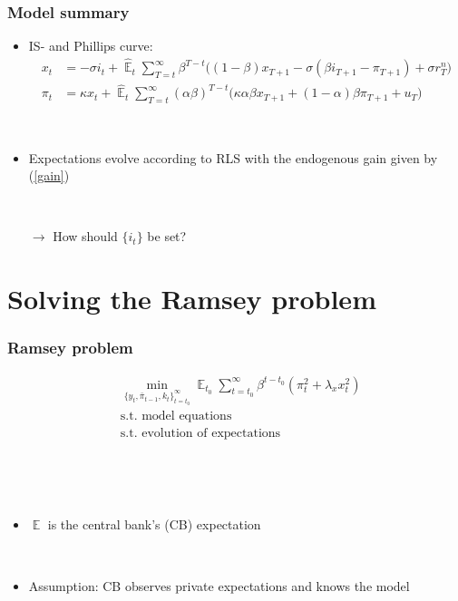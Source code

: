 \documentclass[10pt]{beamer}
\DeclareMathOperator{\E}{\mathbb{E}}
\begin{document}
\begin{frame}
	\frametitle{Model summary}
	\label{aggregate_LOMS}
\begin{itemize}
\item IS- and Phillips curve:	
 \begin{align}
x_t &=  -\sigma i_t +\hat{\E}_t \sum_{T=t}^{\infty} \beta^{T-t }\big( (1-\beta)x_{T+1} - \sigma(\beta i_{T+1} - \pi_{T+1}) +\sigma r_T^n \big)  \label{NKIS}  \\
\pi_t &= \kappa x_t +\hat{\E}_t \sum_{T=t}^{\infty} (\alpha\beta)^{T-t }\big( \kappa \alpha \beta x_{T+1} + (1-\alpha)\beta \pi_{T+1} + u_T\big) \label{NKPC} 
\end{align}
\hfill \hyperlink{derivations}{} \hyperlink{ALMs}{}

\

\item  Expectations evolve according to RLS with the endogenous gain given by (\ref{gain})

\

\item[$\rightarrow$] How should $\{ i_t \}$ be set?
\end{itemize}



\end{frame}


\section{Solving the Ramsey problem}

\begin{frame}
	\frametitle{Ramsey problem}
	 \begin{align*}
& \min_{ \{y_t, \bar{\pi}_{t-1}, k_t \}_{t=t_0}^{\infty}} \E_{t_0}\sum_{t=t_0}^{\infty} \beta^{t-t_0} (\pi_t^2  + \lambda_x x_t^2 )  \\
& \text{s.t. model equations} \\
& \text{s.t. evolution of expectations} 
\end{align*}

\

\

\begin{itemize}
\item $\E$ is the central bank's (CB) expectation

\

\item Assumption: CB observes private expectations and knows the model
\end{itemize}

 

\end{frame}
\end{document}
